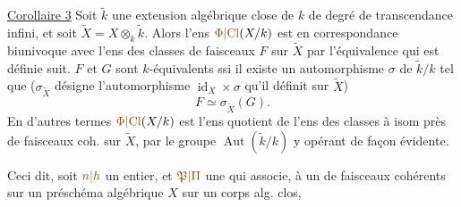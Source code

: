 \uline{Corollaire 3} Soit $\widetilde{k}$ une extension algébrique close de $k$ de degré de transcendance infini, et soit $\widetilde X=X\otimes_k\widetilde k$. Alors l'ens $\unsure{\Phi|\mathrm{Cl}}(X/k)$  est en correspondance biunivoque avec l'ens des classes de faisceaux  $F$ sur $\widetilde X$ par l'équivalence  qui est définie  suit. $F$ et $G$ sont $k$-équivalents ssi il existe un automorphisme $\sigma$ de $\widetilde k/k$ tel que ($\sigma_{\widetilde X}$ désigne l'automorphisme $\operatorname{id}_X\times\sigma$ qu'il définit sur $\widetilde X$)
\[
F\simeq\sigma_{\widetilde X}(G).
\]
En d'autres termes $\unsure{\Phi|\mathrm{Cl}}(X/k)$ est l'ens quotient de l'ens des classes à isom près de faisceaux coh. sur $\widetilde X$, par le groupe $\operatorname{Aut}(\widetilde k/k)$ y opérant de façon évidente.

Ceci dit, soit $\unsure{n|h}$ un entier, et $\unsure{\mathfrak P|\Pi}$ une  qui associe, à un  de faisceaux cohérents sur un préschéma algébrique $X$ sur un corps  alg. clos,
